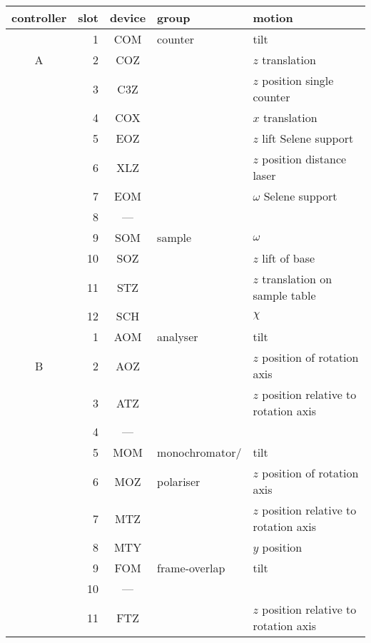 \documentclass[10pt]{article}
\newcommand{\<}{$<$}
\renewcommand{\>}{\/$>$}
\begin{document}
 \vfill
\begin{tabular}{c|rc|ll}
controller & slot & device & group & motion  \\
\hline \hline
            &  1 &\sf COM & counter        & tilt \\
 \textsf{A} &  2 &\sf COZ &                & $z$ translation \\
            &  3 &\sf C3Z &                & $z$ position single counter\\
            &  4 &\sf COX &                & $x$ translation \\
            \cline{2-5}
            &  5 &\sf EOZ &                & $z$ lift Selene support\\
            &  6 &\sf XLZ &                & $z$ position distance laser\\
            &  7 &\sf EOM &                & $\omega$ Selene support\\
            &  8 &\sf --- &                & \\
            \cline{2-5}
            &  9 &\sf SOM & sample         & $\omega$ \\
            & 10 &\sf SOZ &                & $z$ lift of base \\
            & 11 &\sf STZ &                & $z$ translation on sample table \\
            & 12 &\sf SCH &                & $\chi$ \\
\hline \hline
            &  1 &\sf AOM & analyser       & tilt \\
 \textsf{B} &  2 &\sf AOZ &                & $z$ position of rotation axis \\
            &  3 &\sf ATZ &                & $z$ position relative to rotation axis \\
            &  4 &\sf --- &                & \\
            \cline{2-5}
            &  5 &\sf MOM & monochromator/ & tilt \\
            &  6 &\sf MOZ & polariser      & $z$ position of rotation axis \\
            &  7 &\sf MTZ &                & $z$ position relative to rotation axis \\
            &  8 &\sf MTY &                & $y$ position \\
            \cline{2-5}
            &  9 &\sf FOM & frame-overlap  & tilt \\
            & 10 &\sf --- &                & \\
            & 11 &\sf FTZ &                & $z$ position relative to rotation axis \\

\end{tabular}
\end{document}

